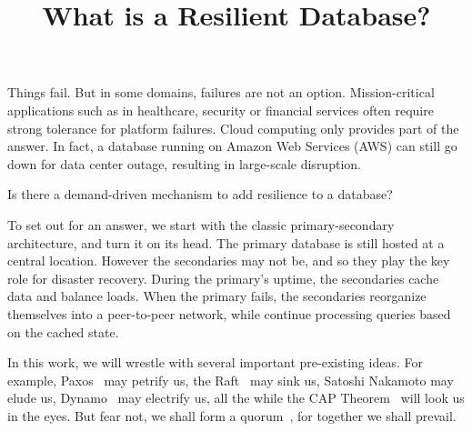 \documentclass[accentcolor=tud9b]{tudexercise}
\title{What is a Resilient Database?}
\begin{document}

Things fail. But in some domains, failures are not an option. Mission-critical
applications such as in healthcare, security or financial services often require
strong tolerance for platform failures. Cloud computing only provides part of
the answer. In fact, a database running on Amazon Web Services (AWS) can still
go down for data center outage, resulting in large-scale disruption.



Is there a demand-driven mechanism to add resilience to a database?

To set out for an answer, we start with the classic primary-secondary architecture,
and turn it on its head.
The primary database is still hosted at a
central location. However the secondaries may not be, and so they play the key role
for disaster recovery.
During the primary's uptime, the secondaries cache data and balance loads. When the primary
fails, the secondaries reorganize
themselves into a peer-to-peer network, while continue processing queries based on
the cached state.


In this work, we will wrestle with several important pre-existing ideas.
For example, Paxos~\cite{} may petrify us, the Raft~\cite{} may sink us, Satoshi Nakamoto may
elude us, Dynamo~\cite{} may electrify us, all the
while the CAP Theorem~\cite{} will look us in the eyes. But fear not, we shall form a
quorum~\cite{}, for together we shall prevail.
\end{document}
